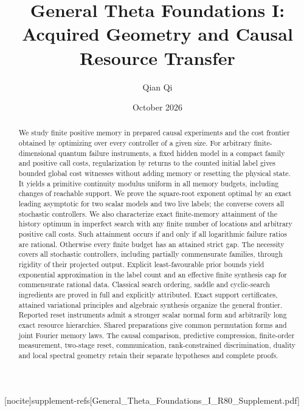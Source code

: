
[nocite]{supplement-refs}[General_Theta_Foundations_I_R80_Supplement.pdf]
\title[Acquired geometry and causal resource transfer]{General Theta Foundations I:\\Acquired Geometry and Causal Resource Transfer}
\author{Qian Qi}\date{October 2026}

\begin{abstract}
We study finite positive memory in prepared causal experiments and the
cost frontier obtained by optimizing over every controller of a given
size.  For arbitrary finite-dimensional quantum failure instruments,
a fixed hidden model in a compact family and positive call costs,
regularization by returns to the counted initial label gives bounded
global cost witnesses without adding memory or resetting the physical
state.  It yields a primitive continuity modulus uniform in all memory
budgets, including changes of reachable support.  We prove the
square-root exponent optimal by an exact leading asymptotic for two
scalar models and two live labels; the converse covers all stochastic
controllers.  We also characterize exact finite-memory attainment of
the history optimum in imperfect search with any finite number of
locations and arbitrary positive call costs.  Such attainment occurs
if and only if all logarithmic failure ratios are rational.  Otherwise
every finite budget has an attained strict gap.  The necessity covers
all stochastic controllers, including partially commensurate families,
through rigidity of their projected output.  Explicit least-favourable
prior bounds yield exponential approximation in the label count and
an effective finite synthesis cap for commensurate rational data.
Classical search ordering, saddle and cyclic-search ingredients are
proved in full and explicitly attributed.
Exact support certificates, attained variational principles and
algebraic synthesis organize the general frontier.  Reported reset
instruments admit a stronger scalar normal form and arbitrarily long
exact resource hierarchies.  Shared preparations give common
permutation forms and joint Fourier memory laws.  The causal comparison,
predictive compression, finite-order measurement, two-stage reset,
communication, rank-constrained discrimination, duality and local
spectral geometry retain their separate hypotheses and complete proofs.
\end{abstract}
